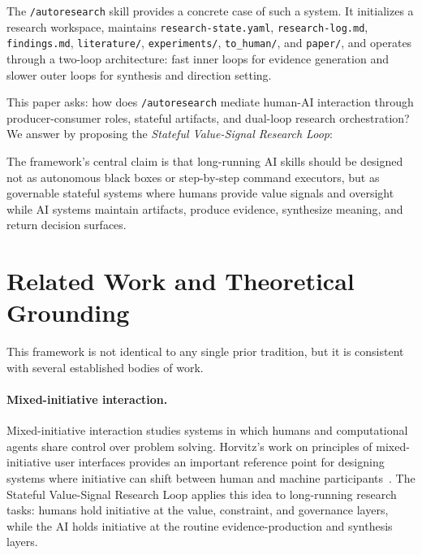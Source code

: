 \documentclass[11pt]{article}
\begin{document}
The \texttt{/autoresearch} skill provides a concrete case of such a system. It initializes a research workspace, maintains \texttt{research-state.yaml}, \texttt{research-log.md}, \texttt{findings.md}, \texttt{literature/}, \texttt{experiments/}, \texttt{to\_human/}, and \texttt{paper/}, and operates through a two-loop architecture: fast inner loops for evidence generation and slower outer loops for synthesis and direction setting.

This paper asks: how does \texttt{/autoresearch} mediate human-AI interaction through producer-consumer roles, stateful artifacts, and dual-loop research orchestration? We answer by proposing the \textit{Stateful Value-Signal Research Loop}:

\begin{center}
\end{center}

The framework's central claim is that long-running AI skills should be designed not as autonomous black boxes or step-by-step command executors, but as governable stateful systems where humans provide value signals and oversight while AI systems maintain artifacts, produce evidence, synthesize meaning, and return decision surfaces.

\section{Related Work and Theoretical Grounding}

This framework is not identical to any single prior tradition, but it is consistent with several established bodies of work.

\paragraph{Mixed-initiative interaction.}
Mixed-initiative interaction studies systems in which humans and computational agents share control over problem solving. Horvitz's work on principles of mixed-initiative user interfaces provides an important reference point for designing systems where initiative can shift between human and machine participants~\cite{horvitz1999mixedinitiative}. The Stateful Value-Signal Research Loop applies this idea to long-running research tasks: humans hold initiative at the value, constraint, and governance layers, while the AI holds initiative at the routine evidence-production and synthesis layers.
\end{document}
